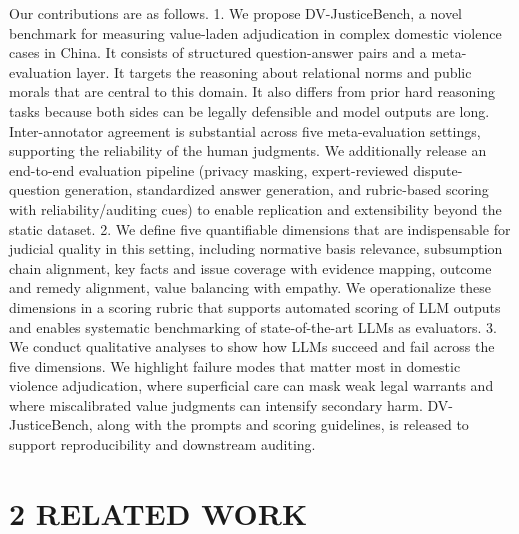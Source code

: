 Our contributions are as follows. 1. We propose DV-JusticeBench, a novel benchmark for measuring value-laden adjudication in complex domestic violence cases in China. It consists of structured question-answer pairs and a meta-evaluation layer. It targets the reasoning about relational norms and public morals that are central to this domain. It also differs from prior hard reasoning tasks because both sides can be legally defensible and model outputs are long. Inter-annotator agreement is substantial across five meta-evaluation settings, supporting the reliability of the human judgments. We additionally release an end-to-end evaluation pipeline (privacy masking, expert-reviewed dispute-question generation, standardized answer generation, and rubric-based scoring with reliability/auditing cues) to enable replication and extensibility beyond the static dataset. 2. We define five quantifiable dimensions that are indispensable for judicial quality in this setting, including normative basis relevance, subsumption chain alignment, key facts and issue coverage with evidence mapping, outcome and remedy alignment, value balancing with empathy. We operationalize these dimensions in a scoring rubric that supports automated scoring of LLM outputs and enables systematic benchmarking of state-of-the-art LLMs as evaluators. 3. We conduct qualitative analyses to show how LLMs succeed and fail across the five dimensions. We highlight failure modes that matter most in domestic violence adjudication, where superficial care can mask weak legal warrants and where miscalibrated value judgments can intensify secondary harm. DV-JusticeBench, along with the prompts and scoring guidelines, is released to support reproducibility and downstream auditing.

\hypertarget{related-work}{%
\section{\texorpdfstring{\textbf{2 RELATED WORK}}{2 RELATED WORK}}\label{related-work}}

